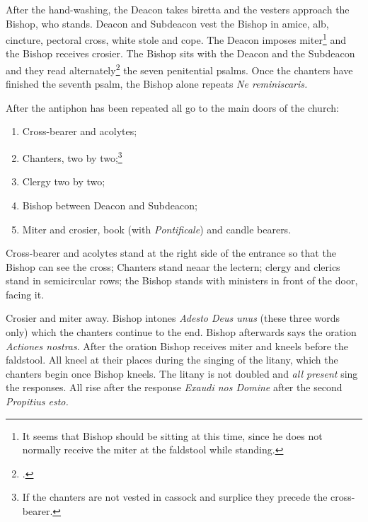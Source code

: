 \documentclass[letterpaper]{report}
\begin{document}
{\rubric After the hand-washing, the Deacon takes biretta and the vesters
approach the Bishop, who stands. Deacon and Subdeacon vest the Bishop in amice,
alb, cincture, pectoral cross, white stole and cope. The Deacon imposes
miter\footnote{It seems that Bishop should be sitting at this time, since he
does not normally receive the miter at the faldstool while standing.} and the
Bishop receives crosier. The Bishop sits with the Deacon and the Subdeacon and
they read alternately\footcite[The bishop usually reads the first verse of each
psalm and recites the verse \textit{Gloria Patri.}][note 3, p.
39.]{consecranda} the seven penitential psalms. Once the chanters have finished
the seventh psalm, the Bishop alone repeats \textit{Ne reminiscaris.}

\rubric After the antiphon has been repeated all go to the main doors of the
church:

\begin{enumerate}

    \item Cross-bearer and acolytes;

    \item Chanters, two by two;\footnote{If the chanters are not vested in
        cassock and surplice they precede the cross-bearer.}

    \item Clergy two by two;

    \item Bishop between Deacon and Subdeacon;

    \item Miter and crosier, book (with \textit{Pontificale}) and candle
        bearers.

\end{enumerate}

Cross-bearer and acolytes stand at the right side of the entrance so that the
Bishop can see the cross; Chanters stand neaar the lectern; clergy and clerics
stand in semicircular rows; the Bishop stands with ministers in front of the
door, facing it.

\rubric Crosier and miter away. Bishop intones \textit{Adesto Deus unus} (these
three words only) which the chanters continue to the end. Bishop afterwards
says the oration \textit{Actiones nostras}. After the oration Bishop receives
miter and kneels before the faldstool. All kneel at their places during the
singing of the litany, which the chanters begin once Bishop kneels. The litany
is not doubled and \textit{all present} sing the responses. All rise after the
response \textit{Exaudi nos Domine} after the second \textit{Propitius esto.}

}
\end{document}
